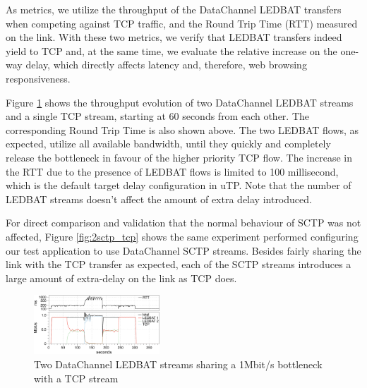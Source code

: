 \documentclass{sig-alternate}
\begin{document}
As metrics, we utilize the throughput of the DataChannel LEDBAT transfers when competing
against TCP traffic, and the Round Trip Time (RTT) measured on the link. With these two
metrics, we verify that LEDBAT transfers indeed yield to TCP and, at the same time, we
evaluate the relative increase on the one-way delay, which directly affects latency and,
therefore, web browsing responsiveness.

Figure \ref{fig:2ledbat_tcp} shows the throughput evolution of two DataChannel LEDBAT
streams and a single TCP stream, starting at 60 seconds from each other. The corresponding
Round Trip Time is also shown above. The two LEDBAT flows, as expected, utilize all
available bandwidth, until they quickly and completely release the bottleneck in favour of
the higher priority TCP flow. The increase in the RTT due to the presence of LEDBAT flows
is limited to 100 millisecond, which is the default target delay configuration in
uTP. Note that the number of LEDBAT streams doesn't affect the amount of extra delay
introduced.


For direct comparison and validation that the normal behaviour of SCTP was not affected,
Figure \ref{fig:2sctp_tcp} shows the same experiment performed configuring our test
application to use DataChannel SCTP streams. Besides fairly sharing the link with the TCP
transfer as expected, each of the SCTP streams introduces a large amount of extra-delay on
the link as TCP does.

\begin{figure}[t]
  \centering
    \includegraphics[width=0.42\textwidth]{figs/2ledbat_tcp}
\vspace*{-0.38cm}
	\caption{\small{Two DataChannel LEDBAT streams sharing a 1Mbit/s bottleneck with a TCP stream}} \label{fig:2ledbat_tcp}
\end{figure}
\end{document}
